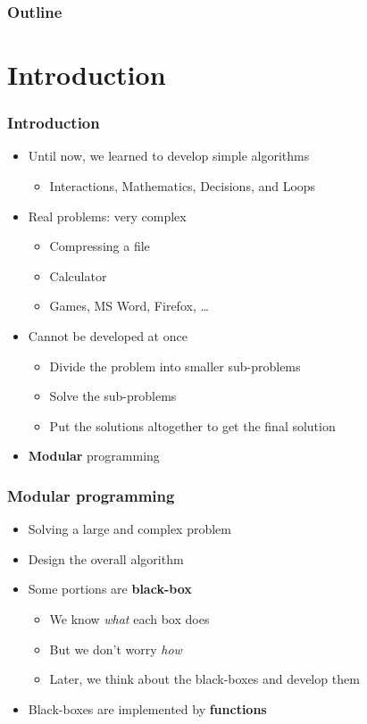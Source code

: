 \documentclass{../c-lecture}
\subtitle{Functions}
\begin{document}
\begin{frame}
  \titlepage{}
\end{frame}
\begin{frame}
  \frametitle{Outline}
  \tableofcontents{}
\end{frame}

\section{Introduction}

\begin{frame}
  \frametitle{Introduction}
  \begin{itemize}
    \item Until now, we learned to develop simple algorithms
    \begin{itemize}
      \item Interactions, Mathematics, Decisions, and Loops
    \end{itemize}
    \item Real problems: very complex
    \begin{itemize}
      \item Compressing a file
      \item Calculator
      \item Games, MS Word, Firefox, \ldots
    \end{itemize}
    \item Cannot be developed at once
    \begin{itemize}
      \item Divide the problem into smaller sub-problems
      \item Solve the sub-problems
      \item Put the solutions altogether to get the final solution
    \end{itemize}
    \item \textbf{\color{Melon} Modular} programming
  \end{itemize}
\end{frame}

\begin{frame}
  \frametitle{Modular programming}
  \begin{itemize}
    \item Solving a large and complex problem
    \item Design the overall algorithm
    \item Some portions are \textbf{\color{Orange} black-box}
    \begin{itemize}
      \item We know \textit{\color{LimeGreen} what} each box does
      \item But we don't worry \textit{\color{Cyan} how}
      \item Later, we think about the black-boxes and develop them
    \end{itemize}
    \item
      Black-boxes are implemented by \textbf{\color{RubineRed} functions}
  \end{itemize}
\end{frame}
\end{document}
